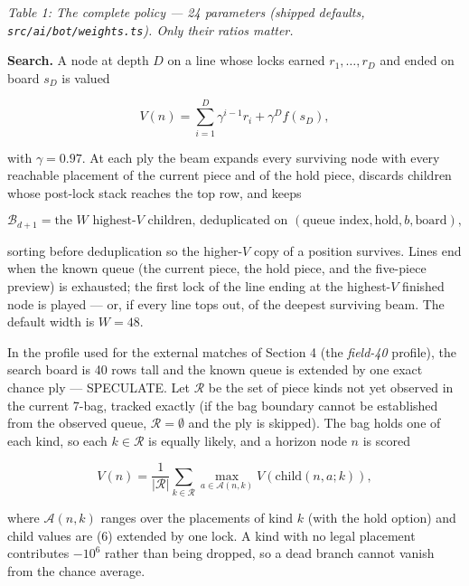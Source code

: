 \documentclass[
  11pt,
]{article}
\begin{document}
\emph{Table 1: The complete policy --- 24 parameters (shipped defaults,
\texttt{src/ai/bot/weights.ts}). Only their ratios matter.}

\textbf{Search.} A node at depth \(D\) on a line whose locks earned
\(r_1, \dots,
r_D\) and ended on board \(s_D\) is valued

\begin{equation}V(n) = \sum_{i=1}^{D} \gamma^{i-1} r_i + \gamma^D f(s_D),
\end{equation}

with \(\gamma = 0.97\). At each ply the beam expands every surviving
node with every reachable placement of the current piece and of the hold
piece, discards children whose post-lock stack reaches the top row, and
keeps

\begin{equation}\mathcal{B}_{d+1} = \text{the } W \text{ highest-}V \text{ children, deduplicated on } (\text{queue index}, \text{hold}, b, \text{board}),
\end{equation}

sorting before deduplication so the higher-\(V\) copy of a position
survives. Lines end when the known queue (the current piece, the hold
piece, and the five-piece preview) is exhausted; the first lock of the
line ending at the highest-\(V\) finished node is played --- or, if
every line tops out, of the deepest surviving beam. The default width is
\(W = 48\).

In the profile used for the external matches of Section 4 (the
\emph{field-40} profile), the search board is 40 rows tall and the known
queue is extended by one exact chance ply --- SPECULATE. Let
\(\mathcal{R}\) be the set of piece kinds not yet observed in the
current 7-bag, tracked exactly (if the bag boundary cannot be
established from the observed queue, \(\mathcal{R} =
\emptyset\) and the ply is skipped). The bag holds one of each kind, so
each \(k \in \mathcal{R}\) is equally likely, and a horizon node \(n\)
is scored

\begin{equation}V(n) = \frac{1}{|\mathcal{R}|} \sum_{k \in \mathcal{R}} \max_{a \in \mathcal{A}(n, k)} V(\mathrm{child}(n, a; k)),
\end{equation}

where \(\mathcal{A}(n, k)\) ranges over the placements of kind \(k\)
(with the hold option) and child values are (6) extended by one lock. A
kind with no legal placement contributes \(-10^6\) rather than being
dropped, so a dead branch cannot vanish from the chance average.
\end{document}
